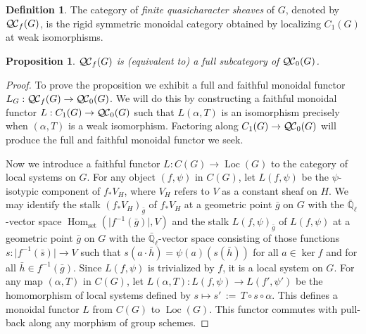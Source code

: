 \documentclass[11pt]{amsart}
\theoremstyle{plain}
\newtheorem{proposition}[theorem]{Proposition}
\theoremstyle{definition}
\newtheorem{definition}[theorem]{Definition}
\theoremstyle{remark}
\newcommand{\EE}{\mathbb{\bar Q}_\ell}
\DeclareMathOperator{\Hom}{Hom}
\newcommand{\abs}[1]{{\vert #1 \vert}}
\newcommand{\ceq}{{\, :=\, }}
\newcommand{\QC}{{\mathcal{Q\hskip-0.8pt C}}}
\newcommand{\QCb}{{\QC_0}}
\newcommand{\QCf}{{\QC_f}}
\newcommand{\Loc}{{\operatorname{Loc}}}
\begin{document}
\begin{definition}
The category of \emph{finite quasicharacter sheaves} of $G$, denoted by $\QCf(G)$, is the rigid symmetric monoidal category obtained by localizing $C_1(G)$ at weak isomorphisms.
\end{definition}

\begin{proposition}\label{prop:bounded}
 $\QCf(G)$ is (equivalent to) a full subcategory of $\QCb(G)$.
\end{proposition}

\begin{proof}
 To prove the proposition we exhibit a full and faithful monoidal functor $L_G : \QCf(G) \to \QCb(G)$.
 We will do this by constructing a faithful monoidal functor $L : C_1(G) \to \QCb(G)$ 
 such that $L(\alpha,T)$ is an isomorphism precisely when $(\alpha,T)$ is a weak isomorphism. 
 Factoring along $C_1(G) \to \QCb(G)$ will produce the full and faithful monoidal functor we seek.

 Now we introduce a faithful functor $L : C(G) \to \Loc(G)$ to the category of local systems on $G$.
 For any object $(f,\psi)$ in $C(G)$, let $L(f,\psi)$ be the $\psi$-isotypic component of $f_* V_H$, 
 where $V_H$ refers to $V$ as a constant sheaf on $H$. 
 We may identify the stalk $(f_* V_H)_{\bar g}$ of $f_* V_H$ at a geometric point ${\bar g}$ on $G$ 
 with the $\EE$-vector space $\Hom_\text{set}(\abs{f^{-1}({\bar g})},V)$ 
 and the stalk $L(f,\psi)_{\bar g}$ of $L(f,\psi)$ at a geometric point ${\bar g}$ on $G$ 
 with the $\EE$-vector space consisting of those functions $s: \abs{f^{-1}({\bar s})} \to V$ such that 
 $s(a\cdot {\bar h}) = \psi(a)(s({\bar h}))$ for all $a\in \ker f$ and for all ${\bar h} \in f^{-1}({\bar g})$.
 Since $L(f,\psi)$ is trivialized by $f$, it is a local system on $G$.
 For any map $(\alpha,T)$ in $C(G)$, let $L(\alpha,T) : L(f,\psi) \to L(f',\psi')$ be the homomorphism of local systems defined 
 by $s \mapsto s' \ceq T\circ s\circ \alpha$. 
 This defines a monoidal functor $L$ from $C(G)$ to $\Loc(G)$. 
 This functor commutes with pull-back along any morphism of group schemes.
  

\end{proof}
\end{document}
